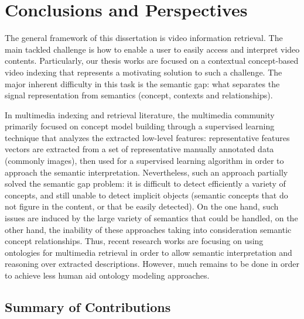 \chapter{Conclusions and Perspectives}
\label{conlusion}

	The general framework of this dissertation is video information retrieval. 
	The main tackled challenge is how to enable a user to easily access and interpret 
	video contents. Particularly, our thesis works are focused on a contextual 
	concept-based video indexing that represents a motivating solution to such a challenge. 
	The major inherent difficulty in this task is the semantic gap: what separates the signal
	representation from semantics (concept, contexts and relationships).

	In multimedia indexing and retrieval literature, the multimedia community primarily focused
	on concept model building through a supervised learning technique that analyzes the extracted 
	low-level features: representative features vectors are extracted from a set of representative 
	manually annotated data (commonly images), then used  for a supervised learning algorithm in order 
	to approach the semantic interpretation. Nevertheless, such an approach partially solved the semantic gap 
	problem: it is difficult to detect efficiently a variety of concepts, and still unable to detect 
	implicit objects (semantic concepts that do not figure in the content, or that  be easily 
	detected). On the one hand, such issues are induced by the large variety of semantics that could be handled, 
	on the other hand, the inability of these approaches taking into consideration semantic concept relationships.
	Thus, recent research works are focusing on using ontologies for multimedia retrieval in order
	to allow semantic interpretation and reasoning over extracted descriptions. However, much
	remains to be done in order to achieve less human aid ontology modeling approaches.

	\section{Summary of Contributions}

